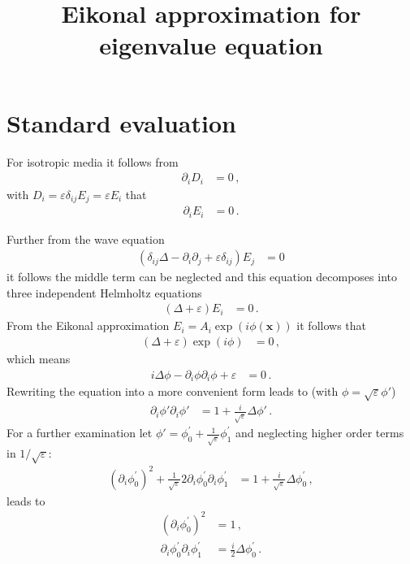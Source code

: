 \documentclass[a4paper,10pt]{revtex4-1}
\title{Eikonal approximation for eigenvalue equation}
\begin{document}
\section{Standard evaluation}

For isotropic media it follows from
\begin{align}
 \partial_i D_i &= 0\,,
\end{align}
with $D_i = \varepsilon \delta_{ij} E_j = \varepsilon E_i$ that
\begin{align}
 \partial_i E_i &= 0\,.
\end{align}

Further from the wave equation
\begin{align}
 (\delta_{ij} \Delta - \partial_i \partial_j + \varepsilon \delta_{ij}) E_j &= 0
\end{align}
it follows the middle term can be neglected and this equation decomposes into three independent Helmholtz equations
\begin{align}
  (\Delta + \varepsilon) E_i &= 0\,. 
\end{align}
From the Eikonal approximation $E_i = A_i \exp(i \phi(\mathbf{x}))$ it follows that
\begin{align}
  (\Delta + \varepsilon) \exp(i \phi) &= 0\,,
\end{align}
which means
\begin{align}
 i \Delta \phi - \partial_i \phi \partial_i \phi + \varepsilon &= 0\,.
\end{align}
Rewriting the equation into a more convenient form leads to (with $\phi = \sqrt{\varepsilon} \phi'$)
\begin{align}
 \partial_i \phi' \partial_i \phi' &= 1 + \frac{i}{\sqrt{\varepsilon}} \Delta \phi'\,.
\end{align}
For a further examination let $\phi' = \phi^\prime_0 + \frac{1}{\sqrt{\varepsilon}} \phi^\prime_1$ and neglecting higher order terms in $1/\sqrt{\varepsilon}$:
\begin{align}
 (\partial_i \phi^\prime_0)^2 + \frac{1}{\sqrt{\varepsilon}} 2 \partial_i \phi^\prime_0 \partial_i \phi^\prime_1 &= 1 + \frac{i}{\sqrt{\varepsilon}} \Delta \phi^\prime_0\,,
\end{align}
leads to
\begin{align}
 (\partial_i \phi^\prime_0)^2 &= 1\,,\\
 \partial_i \phi^\prime_0 \partial_i \phi^\prime_1 &= \frac{i}{2} \Delta \phi^\prime_0\,.
\end{align}
\end{document}
